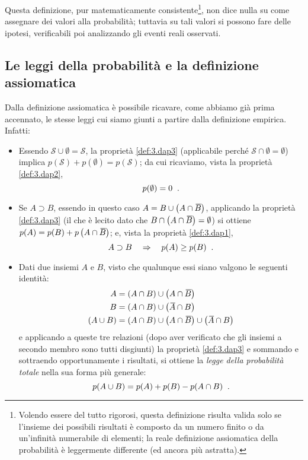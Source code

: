 Questa definizione, pur matematicamente
consistente\/\footnote{Volendo essere del tutto rigorosi,
  questa definizione risulta valida solo se l'insieme dei
  possibili risultati \`e composto da un numero finito o da
  un'infinit\`a numerabile di elementi; la reale definizione
  assiomatica della probabilit\`a \`e leggermente differente
  (ed ancora pi\`u astratta).}, non dice nulla su come
assegnare dei valori alla probabilit\`a; tuttavia su tali
valori si possono fare delle ipotesi, verificabili poi
analizzando gli eventi reali osservati.

\subsection{Le leggi della probabilit\`a e la
  definizione assiomatica}
\label{ch:3.lpdeas}
Dalla definizione assiomatica \`e possibile ricavare, come
abbiamo gi\`a prima accennato, le stesse leggi cui siamo
giunti a partire dalla definizione empirica.  Infatti:
\begin{itemize}
\item Essendo $\mathcal{S} \cup \emptyset = \mathcal{S}$, la
  propriet\`a \ref{def:3.dap3} (applicabile perch\'e
  $\mathcal{S} \cap \emptyset = \emptyset$) implica
  $p(\mathcal{S}) + p(\emptyset) = p(\mathcal{S})$; da cui
  ricaviamo, vista la propriet\`a \ref{def:3.dap2},
  \begin{equation*}
    p(\emptyset) = 0 \;\; .
  \end{equation*}
\item Se $A \supset B$, essendo in questo caso $A = B \cup
  \left( A \cap \ob{B} \right)$, applicando la propriet\`a
  \ref{def:3.dap3} (il che \`e lecito dato che $B \cap
  \left( A \cap \ob{B} \right) = \emptyset$) si ottiene
  $p(A) = p(B) + p \left( A \cap \ob{B} \right)$; e, vista
  la propriet\`a \ref{def:3.dap1},
  \begin{equation*}
    A \supset B \quad \Rightarrow \quad p(A) \geq p(B) \;\; .
  \end{equation*}
\item Dati due insiemi $A$ e $B$, visto che qualunque essi
  siano valgono le seguenti identit\`a:
  \begin{align*}
    A &= (A \cap B) \cup \left( A \cap \ob{B} \right) \\
    B &= (A \cap B) \cup \left( \ob{A} \cap B \right) \\
    (A \cup B) &= (A \cap B) \cup \left( A \cap \ob{B} \right)
      \cup \left( \ob{A} \cap B \right) \\
  \end{align*}
  e applicando a queste tre relazioni (dopo aver verificato
  che gli insiemi a secondo membro sono tutti disgiunti) la
  propriet\`a \ref{def:3.dap3} e sommando e sottraendo
  opportunamente i risultati, si ottiene la \emph{legge
    della probabilit\`a totale} nella sua forma pi\`u
  generale:
  \begin{equation*}%
  \index{probabilit\`a!totale (teorema della)}
    p(A \cup B) = p(A) + p(B) - p(A \cap B) \peq .
  \end{equation*}
\end{itemize}

